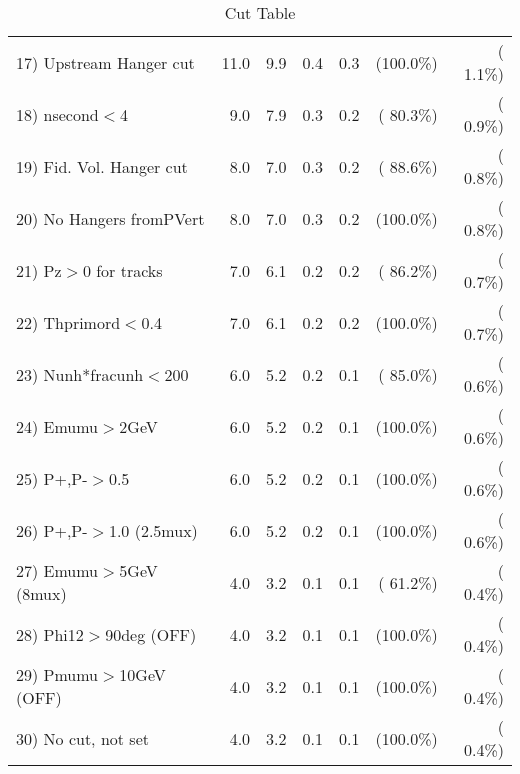 \begin{table}[h!]
\begin{tabular}{||l||r|r|r|r|r|r||}
 17) Upstream Hanger cut  &         11.0 &          9.9 &          0.4 &          0.3 & (100.0\%) & (  1.1\%) \\
 18) nsecond$<$4          &          9.0 &          7.9 &          0.3 &          0.2 & ( 80.3\%) & (  0.9\%) \\
 19) Fid. Vol. Hanger cut &          8.0 &          7.0 &          0.3 &          0.2 & ( 88.6\%) & (  0.8\%) \\
 20) No Hangers fromPVert &          8.0 &          7.0 &          0.3 &          0.2 & (100.0\%) & (  0.8\%) \\
 21) Pz$>$0 for tracks    &          7.0 &          6.1 &          0.2 &          0.2 & ( 86.2\%) & (  0.7\%) \\
 22) Thprimord$<$0.4      &          7.0 &          6.1 &          0.2 &          0.2 & (100.0\%) & (  0.7\%) \\
 23) Nunh*fracunh$<$200   &          6.0 &          5.2 &          0.2 &          0.1 & ( 85.0\%) & (  0.6\%) \\
 24) Emumu$>$2GeV         &          6.0 &          5.2 &          0.2 &          0.1 & (100.0\%) & (  0.6\%) \\
 25) P+,P-$>$0.5          &          6.0 &          5.2 &          0.2 &          0.1 & (100.0\%) & (  0.6\%) \\
 26) P+,P-$>$1.0 (2.5mux) &          6.0 &          5.2 &          0.2 &          0.1 & (100.0\%) & (  0.6\%) \\
 27) Emumu$>$5GeV  (8mux) &          4.0 &          3.2 &          0.1 &          0.1 & ( 61.2\%) & (  0.4\%) \\
 28) Phi12$>$90deg  (OFF) &          4.0 &          3.2 &          0.1 &          0.1 & (100.0\%) & (  0.4\%) \\
 29) Pmumu$>$10GeV  (OFF) &          4.0 &          3.2 &          0.1 &          0.1 & (100.0\%) & (  0.4\%) \\
 30) No cut, not set      &          4.0 &          3.2 &          0.1 &          0.1 & (100.0\%) & (  0.4\%) \\
 \hline
 \hline
 \end{tabular}
 \caption{Cut Table           }
 \label{tab-cutcohjpsi-mumu_cohrho0}
 \end{table}
